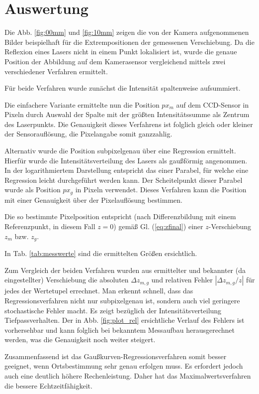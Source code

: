 \section{Auswertung}

Die Abb.  \ref{fig:00mm} und \ref{fig:10mm} zeigen die von der Kamera aufgenommenen Bilder beispielhaft für die Extrempositionen der gemessenen Verschiebung. Da die Reflexion eines Lasers nicht in einem Punkt lokalisiert ist, wurde die genaue Position der Abbildung auf dem Kamerasensor vergleichend mittels zwei verschiedener Verfahren ermittelt.

Für beide Verfahren wurde zunächst die Intensität spaltenweise aufsummiert.

Die einfachere Variante ermittelte nun die Position $px_m$ auf dem CCD-Sensor in Pixeln  durch Auswahl der Spalte mit der größten Intensitätssumme als Zentrum des Laserpunkts. Die Genauigkeit dieses Verfahrens ist folglich gleich oder kleiner der Sensorauflösung, die Pixelangabe somit ganzzahlig.

Alternativ wurde die Position subpixelgenau über eine Regression ermittelt. Hierfür wurde die Intensitätsverteilung des Lasers als gaußförmig angenommen. In der logarithmiertem Darstellung entspricht das einer Parabel, für welche eine Regression leicht durchgeführt werden kann. Der Scheitelpunkt dieser Parabel wurde als Position $px_g$ in Pixeln verwendet. Dieses Verfahren kann die Position mit einer Genauigkeit über der Pixelauflösung bestimmen.

Die so bestimmte Pixelposition entspricht (nach Differenzbildung mit einem Referenzpunkt, in diesem Fall $z=0$) gemäß Gl. (\ref{eq:zfinal}) einer $z$-Verschiebung $z_m$ bzw. $z_g$.

In Tab. \ref{tab:messwerte} sind die ermittelten Größen ersichtlich.

Zum Vergleich der beiden Verfahren wurden aus ermittelter und bekannter (da eingestellter) Verschiebung die absoluten $\Delta z_{m,g}$ und relativen Fehler $|\Delta z_{m,g}/z|$ für jedes der Wertetupel errechnet. Man erkennt schnell, dass das Regressionsverfahren nicht nur subpixelgenau ist, sondern auch viel geringere stochastische Fehler macht. Es zeigt bezüglich der Intensitätsverteilung Tiefpassverhalten. Der in Abb. \ref{fig:plot_rel} ersichtliche Verlauf des Fehlers ist vorhersehbar und kann folglich bei bekanntem Messaufbau herausgerechnet werden, was die Genauigkeit noch weiter steigert.

Zusammenfassend ist das Gaußkurven-Regressionsverfahren somit besser geeignet, wenn Ortsbestimmung sehr genau erfolgen muss. Es erfordert jedoch auch eine deutlich höhere Rechenleistung. Daher hat das Maximalwertsverfahren die bessere Echtzeitfähigkeit.

